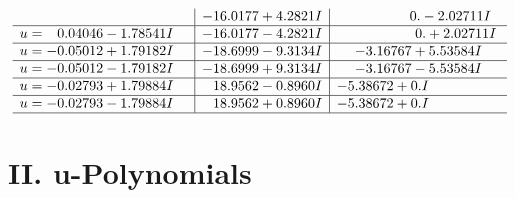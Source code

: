 \documentclass[1p]{elsarticle_modified}
\theoremstyle{definition}
\begin{document}
$$\begin{array}{c|c|c}
 & -16.0177 + 4.2821 I & \phantom{-0.000000 } 0. - 2.02711 I \\ \hline\begin{aligned}
u &= \phantom{-}0.04046 - 1.78541 I\end{aligned}
 & -16.0177 - 4.2821 I & \phantom{-0.000000 -}0. + 2.02711 I \\ \hline\begin{aligned}
u &= -0.05012 + 1.79182 I\end{aligned}
 & -18.6999 - 9.3134 I & -3.16767 + 5.53584 I \\ \hline\begin{aligned}
u &= -0.05012 - 1.79182 I\end{aligned}
 & -18.6999 + 9.3134 I & -3.16767 - 5.53584 I \\ \hline\begin{aligned}
u &= -0.02793 + 1.79884 I\end{aligned}
 & \phantom{-}18.9562 - 0.8960 I & -5.38672 + 0. I\phantom{ +0.000000I} \\ \hline\begin{aligned}
u &= -0.02793 - 1.79884 I\end{aligned}
 & \phantom{-}18.9562 + 0.8960 I & -5.38672 + 0. I\phantom{ +0.000000I}\\
 \hline 
 \end{array}$$\newpage
\newpage\renewcommand{\arraystretch}{1}
\centering \section*{ II. u-Polynomials}
\end{document}
